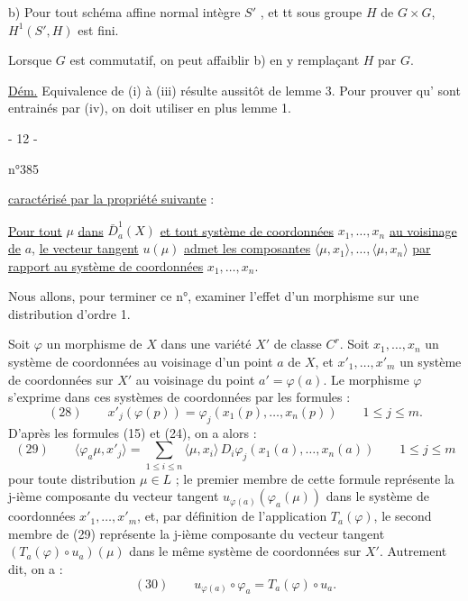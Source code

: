 b) Pour tout   schéma affine normal intègre $S'$ ,
et tt sous groupe $H$ de $G\times G$,
$H^1(S',H)$ est fini.

Lorsque $G$ est commutatif, on peut affaiblir b) en y remplaçant $H$ par $G$.


\uline{Dém.} Equivalence de (i) à (iii) résulte aussitôt de lemme 3. Pour prouver qu' sont entrainés par (iv), on doit utiliser en plus lemme 1.

\begin{center}- 12 -\end{center}
\begin{flushright}n°385\end{flushright}
\uline{caractérisé par la propriété suivante} :

\uline{Pour tout} $\mu$ \uline{dans} $\bar D_a^1(X)$ \uline{et tout système de coordonnées} $x_1,\ldots,x_n$ \uline{au voisinage de} $a$, \uline{le vecteur tangent} $u(\mu)$ \uline{admet les composantes} $\langle\mu,x_1\rangle,\ldots,\langle\mu,x_n\rangle$ \uline{par rapport au système de coordonnées} $x_1,\ldots,x_n$.

Nous allons, pour terminer ce n°, examiner l'effet d'un morphisme sur une distribution d'ordre 1.

Soit $\varphi$ un morphisme de $X$ dans une variété $X'$ de classe $C^r$. Soit $x_1,\ldots,x_n$ un système de coordonnées au voisinage d'un point $a$ de $X$, et $x'_1,\ldots,x'_m$ un système de coordonnées sur $X'$ au voisinage du point $a'=\varphi(a)$. Le morphisme $\varphi$ s'exprime dans ces systèmes de coordonnées par les formules :
\[
(28)\qquad x'_j(\varphi(p))=\varphi_j(x_1(p),\ldots,x_n(p))
\qquad 1\leq j\leq m.
\]
D'après les formules (15) et (24), on a alors :
\[
(29)\qquad
\langle\varphi_a\mu,x'_j\rangle
=\sum_{1\leq i\leq n}\langle\mu,x_i\rangle\,D_i\varphi_j(x_1(a),\ldots,x_n(a))
\qquad 1\leq j\leq m
\]
pour toute distribution $\mu\in L$ ; le premier membre de cette formule représente la j-ième composante du vecteur tangent $u_{\varphi(a)}(\varphi_a(\mu))$ dans le système de coordonnées $x'_1,\ldots,x'_m$, et, par définition de l'application $T_a(\varphi)$, le second membre de (29) représente la j-ième composante du vecteur tangent $(T_a(\varphi)\circ u_a)(\mu)$ dans le même système de coordonnées sur $X'$. Autrement dit, on a :
\[
(30)\qquad u_{\varphi(a)}\circ\varphi_a=T_a(\varphi)\circ u_a.
\]

